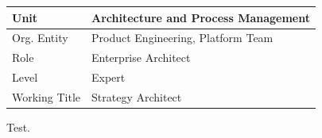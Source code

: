 {\def\LTcaptype{none} %
\begin{longtable}[]{@{}
  >{\raggedright\arraybackslash}p{}
  >{\raggedright\arraybackslash}p{}@{}}
\toprule\noalign{}
\begin{minipage}[b]{\linewidth}\raggedright
Unit
\end{minipage} & \begin{minipage}[b]{\linewidth}\raggedright
Architecture and Process Management
\end{minipage} \\
\midrule\noalign{}
\endhead
\bottomrule\noalign{}
\endlastfoot
Org. Entity & Product Engineering, Platform Team \\
Role & Enterprise Architect \\
Level & Expert \\
Working Title & Strategy Architect \\
\end{longtable}
}

Test.
